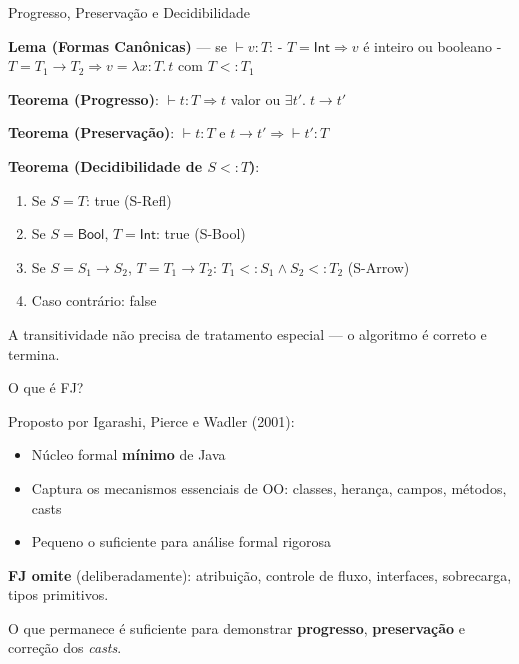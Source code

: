 \begin{frame}{Progresso, Preservação e Decidibilidade}

    \textbf{Lema (Formas Canônicas)} --- se \(\vdash v : T\): -
    \(T = \mathsf{Int} \Rightarrow v\) é inteiro ou booleano -
    \(T = T_1 \to T_2 \Rightarrow v = \lambda x {:} T.\, t\) com
    \(T <: T_1\)

    \textbf{Teorema (Progresso)}: \(\vdash t : T \Rightarrow t\) valor ou
    \(\exists t'.\; t \to t'\)

    \textbf{Teorema (Preservação)}: \(\vdash t : T\) e
    \(t \to t' \Rightarrow \vdash t' : T\)

    \textbf{Teorema (Decidibilidade de \(S <: T\))}:

    \begin{enumerate}

        \item
        Se \(S = T\): true (S-Refl)
        \item
        Se \(S = \mathsf{Bool}\), \(T = \mathsf{Int}\): true (S-Bool)
        \item
        Se \(S = S_1 \to S_2\), \(T = T_1 \to T_2\):
        \(T_1 <: S_1 \wedge S_2 <: T_2\) (S-Arrow)
        \item
        Caso contrário: false
    \end{enumerate}

    A transitividade não precisa de tratamento especial --- o algoritmo é
    correto e termina.
\end{frame}



\begin{frame}{O que é FJ?}

    Proposto por Igarashi, Pierce e Wadler (2001):

    \begin{itemize}

        \item
        Núcleo formal \textbf{mínimo} de Java
        \item
        Captura os mecanismos essenciais de OO: classes, herança, campos,
        métodos, casts
        \item
        Pequeno o suficiente para análise formal rigorosa
    \end{itemize}

    \textbf{FJ omite} (deliberadamente): atribuição, controle de fluxo,
    interfaces, sobrecarga, tipos primitivos.

    O que permanece é suficiente para demonstrar \textbf{progresso},
    \textbf{preservação} e correção dos \emph{casts}.
\end{frame}


